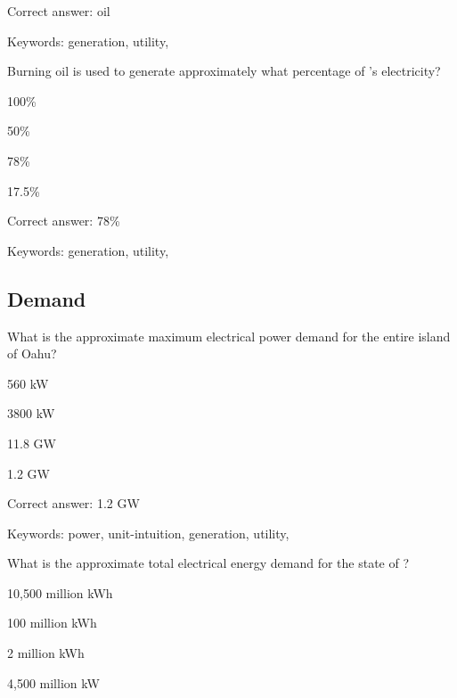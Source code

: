 Correct answer: oil

Keywords: generation, utility, \Hawaii

\begin{question}
	\item Burning oil is used to generate approximately what percentage of \Hawaii's electricity?
\end{question}

\begin{answer}
	\item 100\%
	\item 50\%
	\item 78\%
	\item 17.5\%
\end{answer}

Correct answer: 78\%

Keywords: generation, utility, \Hawaii

\subsection{Demand}

\begin{question}
	\item What is the approximate maximum electrical power demand for the entire island of Oahu?
\end{question}

\begin{answer}
	\item 560 kW
	\item 3800 kW
	\item 11.8 GW
	\item 1.2 GW
\end{answer}

Correct answer: 1.2 GW

Keywords: power, unit-intuition, generation, utility, \Hawaii

\begin{question}
	\item What is the approximate total electrical energy demand for the state of \Hawaii?
\end{question}

\begin{answer}
	\item 10,500 million kWh
	\item 100 million kWh
	\item 2 million kWh
	\item 4,500 million kW
\end{answer}

